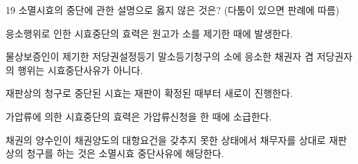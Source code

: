 \begin{question}{19}
소멸시효의 중단에 관한 설명으로 옳지 않은 것은? (다툼이 있으면 판례에 따름)
\begin{choices}
  \item 응소행위로 인한 시효중단의 효력은 원고가 소를 제기한 때에 발생한다.
  \item 물상보증인이 제기한 저당권설정등기 말소등기청구의 소에 응소한 채권자 겸 저당권자의 행위는 시효중단사유가 아니다.
  \item 재판상의 청구로 중단된 시효는 재판이 확정된 때부터 새로이 진행한다.
  \item 가압류에 의한 시효중단의 효력은 가압류신청을 한 때에 소급한다.
  \item 채권의 양수인이 채권양도의 대항요건을 갖추지 못한 상태에서 채무자를 상대로 재판상의 청구를 하는 것은 소멸시효 중단사유에 해당한다.
\end{choices}
\end{question}
